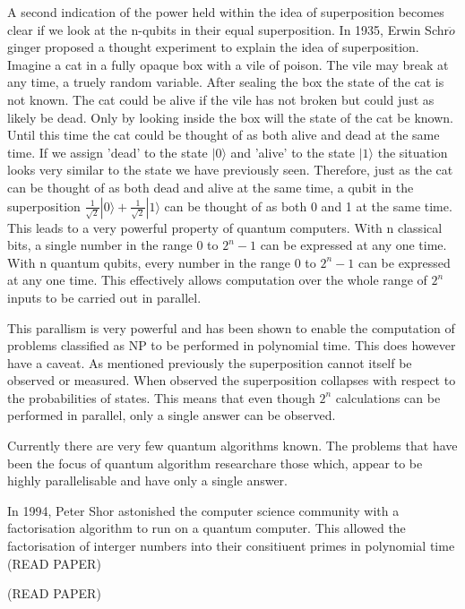 \documentclass[authoryearcitations]{UoYCSproject}
\begin{document}
A second indication of the power held within the idea of superposition becomes clear if we look at the n-qubits in their equal superposition.
In 1935, Erwin Schr$\ddot{o}$ginger proposed a thought experiment to explain the idea of superposition.
Imagine a cat in a fully opaque box with a vile of poison.
The vile may break at any time, a truely random variable.
After sealing the box the state of the cat is not known.
The cat could be alive if the vile has not broken but could just as likely be dead.
Only by looking inside the box will the state of the cat be known.
Until this time the cat could be thought of as both alive and dead at the same time.
If we assign 'dead' to the state $|0\rangle$ and 'alive' to the state $|1\rangle$ the situation looks very similar to the state we have previously seen.
Therefore, just as the cat can be thought of as both dead and alive at the same time, a qubit in the superposition $\frac{1}{\sqrt{2}}|0\rangle+\frac{1}{\sqrt{2}}|1\rangle$ can be thought of as both 0 and 1 at the same time.
This leads to a very powerful property of quantum computers.
With n classical bits, a single number in the range 0 to $2^n-1$ can be expressed at any one time.
With n quantum qubits, every number in the range 0 to $2^n-1$ can be expressed at any one time.
This effectively allows computation over the whole range of $2^n$ inputs to be carried out in parallel.

This parallism is very powerful and has been shown to enable the computation of problems classified as NP to be performed in polynomial time.
This does however have a caveat.
As mentioned previously the superposition cannot itself be observed or measured.
When observed the superposition collapses with respect to the probabilities of states.
This means that even though $2^n$ calculations can be performed in parallel, only a single answer can be observed.



Currently there are very few quantum algorithms known.
The problems that have been the focus of quantum algorithm researchare those which, appear to be highly parallelisable and have only a single answer.

In 1994, Peter Shor astonished the computer science community with a factorisation algorithm to run on a quantum computer.
This allowed the factorisation of interger numbers into their consitiuent primes in polynomial time
(READ PAPER) 
	
(READ PAPER)
\end{document}

